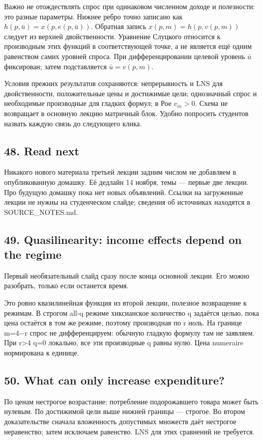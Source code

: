 \documentclass[11pt,a4paper]{article}
\begin{document}
Важно не отождествлять спрос при одинаковом численном доходе и полезности: это разные параметры. Нижнее ребро точно записано как $h(p,\bar u)=x(p,e(p,\bar u))$. Обратная запись $x(p,m)=h(p,v(p,m))$ следует из верхней двойственности. Уравнение Слуцкого относится к производным этих функций в соответствующей точке, а не является ещё одним равенством самих уровней спроса. При дифференцировании целевой уровень $\bar u$ фиксирован; затем подставляется $\bar u=v(p,m)$.

Условия прежних результатов сохраняются: непрерывность и LNS для двойственности, положительные цены и достижимые цели; однозначный спрос и необходимые производные для гладких формул; в Рое $v_m>0$. Схема не возвращает в основную лекцию матричный блок. Удобно попросить студентов назвать каждую связь до следующего клика.

\subsection*{48. Read next}
Никакого нового материала третьей лекции задним числом не добавляем в опубликованную домашку. Её дедлайн 14 ноября, темы — первые две лекции. Про будущую домашку пока нет новых объявлений. Ссылки на загруженные лекции не нужны на студенческом слайде; сведения об источниках находятся в SOURCE\_NOTES.md.

\subsection*{49. Quasilinearity: income effects depend on the regime}
Первый необязательный слайд сразу после конца основной лекции. Его можно разобрать, только если останется время.

Это ровно квазилинейная функция из второй лекции, полезное возвращение к режимам. В строгом all-q режиме хиксианское количество q задаётся целью, пока цена остаётся в том же режиме, поэтому производная по r ноль. На границе m=4−r спрос не дифференцируем: обычную гладкую формулу там не заявляем. При r>4 q=0 локально, все эти производные q равны нулю. Цена numeraire нормирована к единице.

\subsection*{50. What can only increase expenditure?}
По ценам нестрогое возрастание: потребление подорожавшего товара может быть нулевым. По достижимой цели выше нижней границы — строгое. Во втором доказательстве сначала вложенность допустимых множеств даёт нестрогое неравенство; затем исключаем равенство. LNS для этих сравнений не требуется.
\end{document}
